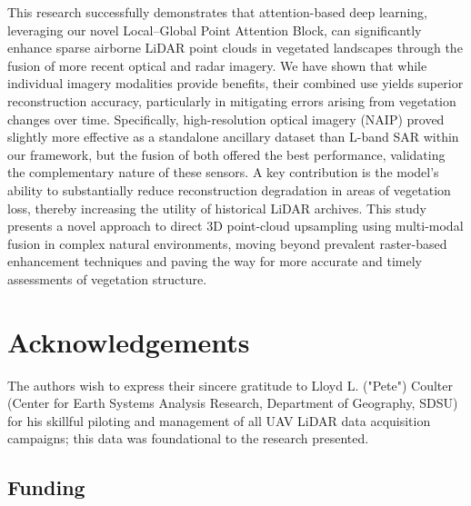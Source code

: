 \documentclass[12pt]{report}
\begin{document}
This research successfully demonstrates that attention-based deep learning, leveraging our novel Local--Global Point Attention Block, can significantly enhance sparse airborne LiDAR point clouds in vegetated landscapes through the fusion of more recent optical and radar imagery. We have shown that while individual imagery modalities provide benefits, their combined use yields superior reconstruction accuracy, particularly in mitigating errors arising from vegetation changes over time. Specifically, high-resolution optical imagery (NAIP) proved slightly more effective as a standalone ancillary dataset than L-band SAR within our framework, but the fusion of both offered the best performance, validating the complementary nature of these sensors. A key contribution is the model's ability to substantially reduce reconstruction degradation in areas of vegetation loss, thereby increasing the utility of historical LiDAR archives. This study presents a novel approach to direct 3D point-cloud upsampling using multi-modal fusion in complex natural environments, moving beyond prevalent raster-based enhancement techniques and paving the way for more accurate and timely assessments of vegetation structure.


\chapter*{Acknowledgements}

The authors wish to express their sincere gratitude to Lloyd L. ("Pete") Coulter (Center for Earth Systems Analysis Research, Department of Geography, SDSU) for his skillful piloting and management of all UAV LiDAR data acquisition campaigns; this data was foundational to the research presented.

\section*{Funding}
\end{document}
